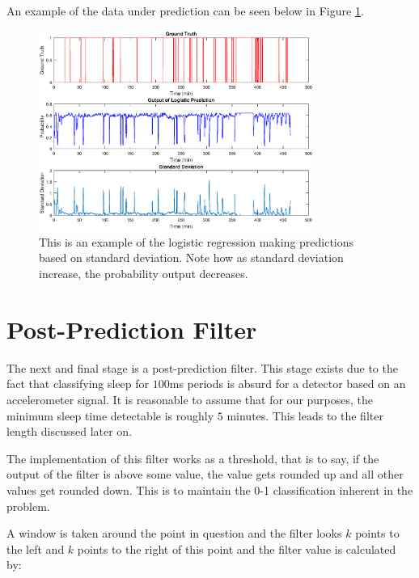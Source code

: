                 An example of the data under prediction can be seen below in Figure \ref{img_regression_ex}.

                \begin{figure}[h]
                    \includegraphics[width=0.8\textwidth]{Images/logistic_regression_ex.eps}
                    \centering
                    \caption{This is an example of the logistic regression making predictions based on standard deviation. Note how as standard deviation increase, the probability output decreases.}
                    \label{img_regression_ex}
                \end{figure}

        \section{Post-Prediction Filter}

            The next and final stage is a post-prediction filter. This stage exists due to the fact that classifying sleep for $100$ms periods is absurd for a detector based on an accelerometer signal. It is reasonable to assume that for our purposes, the minimum sleep time detectable is roughly $5$ minutes. This leads to the filter length discussed later on.

            The implementation of this filter works as a threshold, that is to say, if the output of the filter is above some value, the value gets rounded up and all other values get rounded down. This is to maintain the 0-1 classification inherent in the problem. 

            A window is taken around the point in question and the filter looks $k$ points to the left and $k$ points to the right of this point and the filter value is calculated by:

